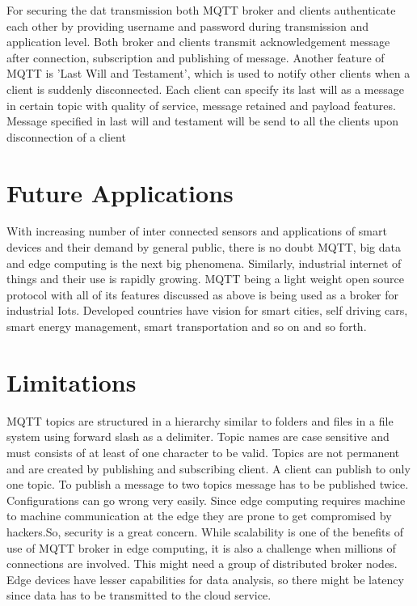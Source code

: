 \documentclass[sigconf]{acmart}
\begin{document}
For securing the dat transmission both MQTT broker and clients authenticate each other by providing username and password during transmission and application level. Both broker and clients transmit acknowledgement message after connection, subscription and publishing of message. Another feature of MQTT is 'Last Will and Testament', which is used to notify other clients when a client is suddenly disconnected. Each client can specify its last will  as a message in certain topic with quality of service, message retained and payload features. Message specified in last will and testament will be send to all the clients upon disconnection of a client \cite{hivemq}

\section{Future Applications}
With increasing number of inter connected sensors and applications of smart devices and their demand by general public, there is no doubt MQTT, big data and edge computing is the next big phenomena. Similarly, industrial internet of things and their use is rapidly growing. MQTT being a light weight open source protocol with all of its features discussed as above is being used as a broker for industrial Iots. Developed countries have vision for smart cities, self driving cars, smart energy management, smart transportation  and so on and so forth.    

\section{Limitations}

MQTT topics are structured in a hierarchy similar to folders and files in a file system using forward slash as a delimiter. Topic names are case sensitive and must consists of at least of one character to be valid.
Topics are not permanent and are created by publishing and subscribing client.
A client can publish to only one topic.
To publish a message to two topics message has to be published twice.
Configurations can go wrong very easily. Since edge computing requires machine to machine communication at the edge they are prone to get compromised by hackers.So, security is a great concern. While scalability is one of the benefits of use of MQTT broker in edge computing, it is also a challenge when millions of connections are involved. This might need a group of distributed broker nodes. Edge devices have lesser capabilities for data analysis, so there might be latency since data has to be transmitted to the cloud service. 
\end{document}
